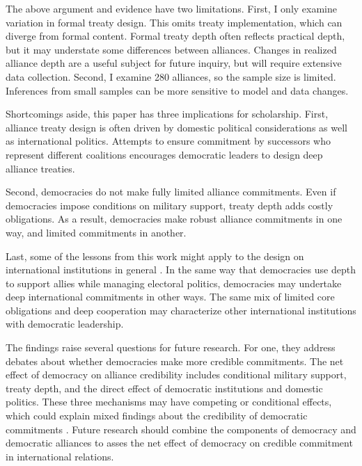 \documentclass[12pt]{article}
\begin{document}
The above argument and evidence have two limitations.
First, I only examine variation in formal treaty design. 
This omits treaty implementation, which can diverge from formal content.   
Formal treaty depth often reflects practical depth, but it may understate some differences between alliances. 
Changes in realized alliance depth are a useful subject for future inquiry, but will require extensive data collection.
Second, I examine 280 alliances, so the sample size is limited. 
Inferences from small samples can be more sensitive to model and data changes. 


Shortcomings aside, this paper has three implications for scholarship. 
First, alliance treaty design is often driven by domestic political considerations as well as international politics. 
Attempts to ensure commitment by successors who represent different coalitions encourages democratic leaders to design deep alliance treaties. 

Second, democracies do not make fully limited alliance commitments.
Even if democracies impose conditions on military support, treaty depth adds costly obligations.
As a result, democracies make robust alliance commitments in one way, and limited commitments in another. 


Last, some of the lessons from this work might apply to the design on international institutions in general \citep{DownesRocke1995, MartinSimmons1998, Koremenosetal2001, Thompson2010}.
In the same way that democracies use depth to support allies while managing electoral politics, democracies may undertake deep international commitments in other ways. 
The same mix of limited core obligations and deep cooperation may characterize other international institutions with democratic leadership. 


The findings raise several questions for future research.  
For one, they address debates about whether democracies make more credible commitments. 
The net effect of democracy on alliance credibility includes conditional military support, treaty depth, and the direct effect of democratic institutions and domestic politics. 
These three mechanisms may have competing or conditional effects, which could explain mixed findings about the credibility of democratic commitments \citep{Schultz1999, Leeds1999, Thyne2012, DownesSechser2012, PotterBaum2014}.
Future research should combine the components of democracy and democratic alliances to asses the net effect of democracy on credible commitment in international relations. 
\end{document}
